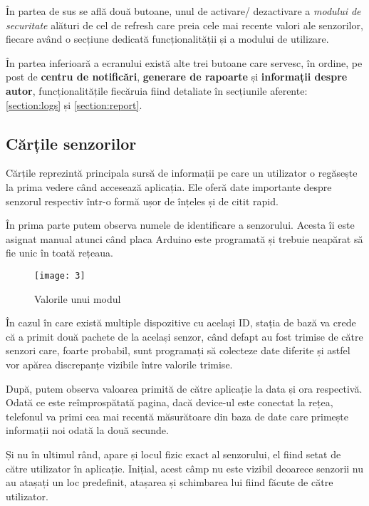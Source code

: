 În partea de sus se află două butoane, unul de activare/ dezactivare a \emph{modului de securitate} alături de cel de refresh care preia cele mai recente valori ale senzorilor, fiecare având o secțiune dedicată funcționalității și a modului de utilizare.

În partea inferioară a ecranului există alte trei butoane care servesc, în ordine, pe post de \textbf{centru de notificări}, \textbf{generare de rapoarte} și \textbf{informații despre autor}, funcționalitățile fiecăruia fiind detaliate în secțiunile aferente: \ref{section:logs} și \ref{section:report}.

\subsection{Cărțile senzorilor}

Cărțile reprezintă principala sursă de informații pe care un utilizator o regăsește la prima vedere când accesează aplicația. Ele oferă date importante despre senzorul respectiv într-o formă ușor de înțeles și de citit rapid.

În prima parte putem observa numele de identificare a senzorului. Acesta îi este asignat manual atunci când placa Arduino este programată și trebuie neapărat să fie unic în toată rețeaua. 

\begin{wrapfigure}{r}{0.4\textwidth}
	\texttt{[image: 3]}
	\caption{Valorile unui modul}
	\label{fig:3}
\end{wrapfigure}

În cazul în care există multiple dispozitive cu același ID, stația de bază va crede că a primit două pachete de la același senzor, când defapt au fost trimise de către senzori care, foarte probabil, sunt programați să colecteze date diferite și astfel vor apărea discrepanțe vizibile între valorile trimise.

După, putem observa valoarea primită de către aplicație la data și ora respectivă. Odată ce este reîmprospătată pagina, dacă device-ul este conectat la rețea, telefonul va primi cea mai recentă măsurătoare din baza de date care primește informații noi odată la două secunde.

Și nu în ultimul rând, apare și locul fizic exact al senzorului, el fiind setat de către utilizator în aplicație. Inițial, acest câmp nu este vizibil deoarece senzorii nu au atașați un loc predefinit, atașarea și schimbarea lui fiind făcute de către utilizator.

